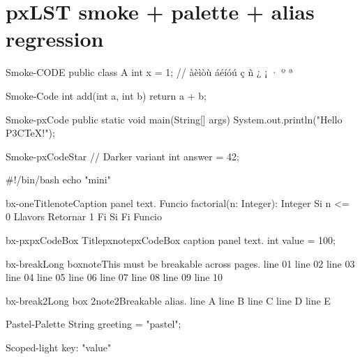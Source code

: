 \documentclass{article}
\begin{document}
\section*{pxLST smoke + palette + alias regression}


\begin{pxCode}{Smoke-CODE}
public class A { int x = 1; } // àèìòù áéíóú ç ñ ¿ ¡ · º ª
\end{pxCode}

\begin{pxCode}[numbers=none]{Smoke-Code}
int add(int a, int b) { return a + b; }
\end{pxCode}

\begin{pxCode}{Smoke-pxCode}
public static void main(String[] args) {
    System.out.println("Hello P3CTeX!");
}
\end{pxCode}

\begin{pxCode*}{Smoke-pxCodeStar}
// Darker variant
int answer = 42;
\end{pxCode*}

\begin{pxCodeMini}[.6\linewidth]
#!/bin/bash
echo "mini"
\end{pxCodeMini}

\begin{pxCodeBox}{bx-one}{Title}{note}{Caption panel text.}
Funcio factorial(n: Integer): Integer
  Si n <= 0 Llavors
    Retornar 1
  Fi Si
Fi Funcio
\end{pxCodeBox}

\begin{pxCodeBox}{bx-px}{pxCodeBox Title}{pxnote}{pxCodeBox caption panel text.}
int value = 100;
\end{pxCodeBox}

\begin{pxCodeBreak}{bx-break}{Long box}{note}{This must be breakable across pages.}
line 01
line 02
line 03
line 04
line 05
line 06
line 07
line 08
line 09
line 10
\end{pxCodeBreak}

\begin{pxCodeBreak}{bx-break2}{Long box 2}{note2}{Breakable alias.}
line A
line B
line C
line D
line E
\end{pxCodeBreak}

\begin{pxCode}{Pastel-Palette}
String greeting = "pastel";
\end{pxCode}

{%
 \begin{pxCode}{Scoped-light}
key: "value"
\end{pxCode}
}
\end{document}
